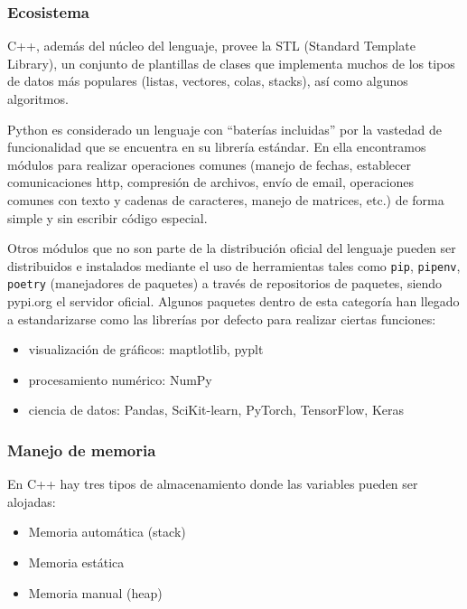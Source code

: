 \documentclass[]{article}
\begin{document}
\subsubsection{Ecosistema}

C++, además del núcleo del lenguaje, provee la STL (Standard Template Library),
un conjunto de plantillas de clases que implementa muchos de los tipos de datos
más populares (listas, vectores, colas, stacks), así como algunos algoritmos. 

Python es considerado un lenguaje con ``baterías incluidas'' por la vastedad de
funcionalidad que se encuentra en su librería estándar. En ella encontramos
módulos para realizar operaciones comunes (manejo de fechas, establecer
comunicaciones http, compresión de archivos, envío de email, operaciones
comunes con texto y cadenas de caracteres, manejo de matrices, etc.) de forma
simple y sin escribir código especial.

Otros módulos que no son parte de la distribución oficial del lenguaje pueden
ser distribuidos e instalados mediante el uso de herramientas tales como
\verb!pip!, \verb!pipenv!, \verb!poetry! (manejadores de paquetes) a través de
repositorios de paquetes, siendo pypi.org el servidor oficial. Algunos paquetes
dentro de esta categoría han llegado a estandarizarse como las librerías por
defecto para realizar ciertas funciones:

\begin{itemize}
    \item visualización de gráficos: maptlotlib, pyplt
    \item procesamiento numérico: NumPy
    \item ciencia de datos: Pandas, SciKit-learn, PyTorch, TensorFlow, Keras
\end{itemize}

\subsubsection{Manejo de memoria}

En C++ hay tres tipos de almacenamiento donde las variables pueden ser
alojadas:

\begin{itemize}
    \item Memoria automática (stack)
    \item Memoria estática
    \item Memoria manual (heap)
\end{itemize}
\end{document}
